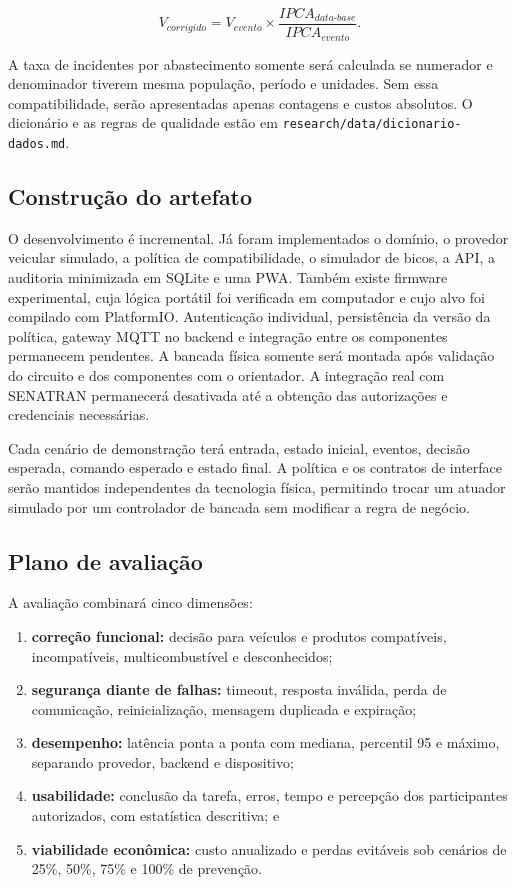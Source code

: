 \begin{equation}
  V_{corrigido}=V_{evento}\times
  \frac{IPCA_{data\mbox{-}base}}{IPCA_{evento}}.
  \label{eq:ipca}
\end{equation}

A taxa de incidentes por abastecimento somente será calculada se numerador e
denominador tiverem mesma população, período e unidades. Sem essa compatibilidade,
serão apresentadas apenas contagens e custos absolutos. O dicionário e as regras
de qualidade estão em \texttt{research/data/dicionario-dados.md}.

\subsection{Construção do artefato}

O desenvolvimento é incremental. Já foram implementados o domínio, o provedor
veicular simulado, a política de compatibilidade, o simulador de bicos, a API,
a auditoria minimizada em SQLite e uma PWA. Também existe firmware experimental,
cuja lógica portátil foi verificada em computador e cujo alvo 
foi compilado com PlatformIO. Autenticação individual,
persistência da versão da política, gateway MQTT no backend e integração entre
os componentes permanecem pendentes. A bancada física somente será montada após
validação do circuito e dos componentes com o orientador. A integração real com
SENATRAN permanecerá desativada até a obtenção das autorizações e credenciais
necessárias.

Cada cenário de demonstração terá entrada, estado inicial, eventos, decisão
esperada, comando esperado e estado final. A política e os contratos de
interface serão mantidos independentes da tecnologia física, permitindo trocar
um atuador simulado por um controlador de bancada sem modificar a regra de
negócio.

\subsection{Plano de avaliação}

A avaliação combinará cinco dimensões:

\begin{enumerate}
  \item \textbf{correção funcional:} decisão para veículos e produtos
  compatíveis, incompatíveis, multicombustível e desconhecidos;
  \item \textbf{segurança diante de falhas:} timeout, resposta inválida, perda
  de comunicação, reinicialização, mensagem duplicada e expiração;
  \item \textbf{desempenho:} latência ponta a ponta com mediana, percentil 95 e
  máximo, separando provedor, backend e dispositivo;
  \item \textbf{usabilidade:} conclusão da tarefa, erros, tempo e percepção dos
  participantes autorizados, com estatística descritiva; e
  \item \textbf{viabilidade econômica:} custo anualizado e perdas evitáveis sob
  cenários de 25\%, 50\%, 75\% e 100\% de prevenção.
\end{enumerate}

